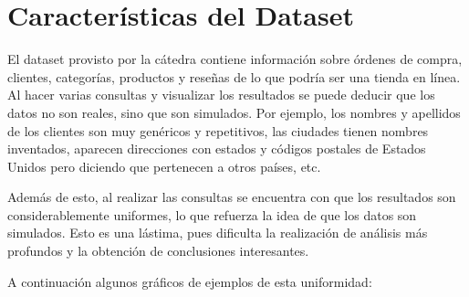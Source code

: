 \section{Características del Dataset}

El dataset provisto por la cátedra contiene información sobre órdenes de compra, clientes, categorías, productos y reseñas de lo que podría ser una tienda en línea. \\
Al hacer varias consultas y visualizar los resultados se puede deducir que los datos no son reales, sino que son simulados. 
Por ejemplo, los nombres y apellidos de los clientes son muy genéricos y repetitivos, las ciudades tienen nombres inventados, aparecen direcciones con estados y códigos postales de Estados Unidos pero diciendo que pertenecen a otros países, etc.

Además de esto, al realizar las consultas se encuentra con que los resultados son considerablemente uniformes, lo que refuerza la idea de que los datos son simulados. Esto es una lástima, pues dificulta la realización de análisis más profundos y la obtención de conclusiones interesantes.

A continuación algunos gráficos de ejemplos de esta uniformidad:


